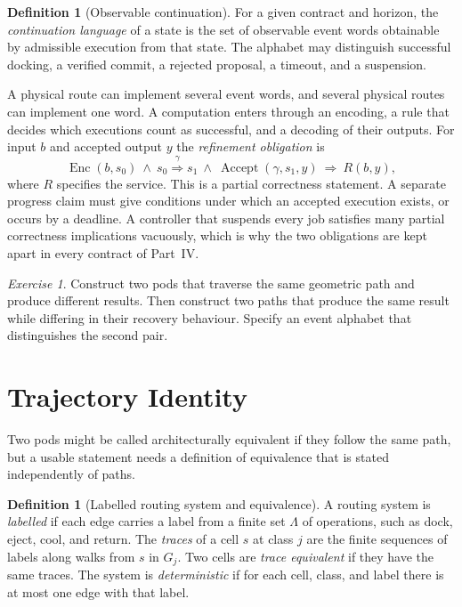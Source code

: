\documentclass[11pt,openany]{book}
\theoremstyle{plain}
\theoremstyle{definition}
\newtheorem{definition}[theorem]{Definition}
\theoremstyle{remark}
\newtheorem{exercise}[theorem]{Exercise}
\begin{document}
\begin{definition}[Observable continuation]
For a given contract and horizon, the \emph{continuation language} of a state is the set of observable event words obtainable by admissible execution from that state. The alphabet may distinguish successful docking, a verified commit, a rejected proposal, a timeout, and a suspension.
\end{definition}

A physical route can implement several event words, and several physical routes can implement one word. A computation enters through an encoding, a rule that decides which executions count as successful, and a decoding of their outputs. For input $b$ and accepted output $y$ the \emph{refinement obligation} is
\begin{equation}
\operatorname{Enc}(b,s_0)\ \wedge\ s_0\overset{\gamma}{\Longrightarrow}s_1\ \wedge\ \operatorname{Accept}(\gamma,s_1,y)\ \Longrightarrow\ R(b,y),
\label{eq:refine}
\end{equation}
where $R$ specifies the service. This is a partial correctness statement. A separate progress claim must give conditions under which an accepted execution exists, or occurs by a deadline. A controller that suspends every job satisfies many partial correctness implications vacuously, which is why the two obligations are kept apart in every contract of Part~IV.

\begin{exercise}
Construct two pods that traverse the same geometric path and produce different results. Then construct two paths that produce the same result while differing in their recovery behaviour. Specify an event alphabet that distinguishes the second pair.
\end{exercise}

\section{Trajectory Identity}

Two pods might be called architecturally equivalent if they follow the same path, but a usable statement needs a definition of equivalence that is stated independently of paths.

\begin{definition}[Labelled routing system and equivalence]
A routing system is \emph{labelled} if each edge carries a label from a finite set $\Lambda$ of operations, such as dock, eject, cool, and return. The \emph{traces} of a cell $s$ at class $j$ are the finite sequences of labels along walks from $s$ in $G_j$. Two cells are \emph{trace equivalent} if they have the same traces. The system is \emph{deterministic} if for each cell, class, and label there is at most one edge with that label.
\end{definition}
\end{document}
